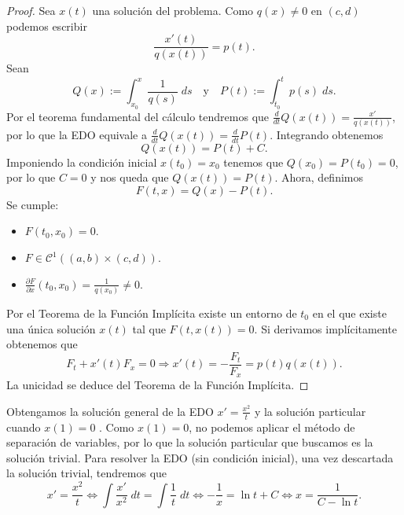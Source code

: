 \begin{proof}
	 Sea $\displaystyle x\left(t\right) $ una solución del problema. Como $\displaystyle q\left(x\right) \neq 0$ en $\displaystyle \left(c,d\right) $ podemos escribir
	\[\frac{x'\left(t\right)}{q\left(x\left(t\right)\right)} = p\left(t\right) .\]
Sean 
\[Q\left(x\right) := \int ^{x}_{x_{0}}\frac{1}{q\left(s\right)} \; d s \quad \text{y} \quad P\left(t\right):= \int ^{t}_{t_{0}}p\left(s\right) \; d s .\]
Por el teorema fundamental del cálculo tendremos que $\displaystyle \frac{d}{dt}Q\left(x\left(t\right)\right) = \frac{x'}{q\left(x\left(t\right)\right)} $, por lo que la EDO equivale a $\displaystyle \frac{d}{dt}Q\left(x\left(t\right)\right) = \frac{d}{dt}P\left(t\right) $. Integrando obtenemos 
\[Q\left(x\left(t\right)\right)= P\left(t\right) + C .\]
Imponiendo la condición inicial $\displaystyle x\left(t_{0}\right)=x_{0} $ tenemos que $\displaystyle Q\left(x_{0}\right) = P\left(t_{0}\right) = 0 $, por lo que $\displaystyle C = 0 $ y nos queda que $\displaystyle Q\left(x\left(t\right)\right)=P\left(t\right) $. Ahora, definimos
\[F\left(t,x\right)= Q\left(x\right)-P\left(t\right) .\]
Se cumple:
\begin{itemize}
\item $\displaystyle F\left(t_{0}, x_{0}\right)=0 $.
\item $\displaystyle F \in \mathcal{C}^{1}\left(\left(a, b\right)\times \left(c,d\right)\right) $.
\item $\displaystyle \frac{\partial F}{\partial x}\left(t_{0}, x_{0}\right)= \frac{1}{q\left(x_{0}\right)} \neq 0 $.
\end{itemize}
Por el Teorema de la Función Implícita existe un entorno de $\displaystyle t_{0} $ en el que existe una única solución $\displaystyle x\left(t\right) $ tal que $\displaystyle F\left(t,x\left(t\right)\right)=0 $. Si derivamos implícitamente obtenemos que 
\[F_{t} + x'\left(t\right)F_{x}= 0 \Rightarrow x'\left(t\right)= - \frac{F_{t}}{F_{x}} = p\left(t\right)q\left(x\left(t\right)\right) .\]
La unicidad se deduce del Teorema de la Función Implícita. 
\end{proof}
\begin{eg}
Obtengamos la solución general de la EDO $\displaystyle x' = \frac{x^{2}}{t} $ y la solución particular cuando $\displaystyle x\left(1\right) = 0 $ . Como $\displaystyle x\left(1\right)=0 $, no podemos aplicar el método de separación de variables, por lo que la solución particular que buscamos es la solución trivial. Para resolver la EDO (sin condición inicial), una vez descartada la solución trivial, tendremos que
\[ x' = \frac{x^{2}}{t} \iff \int \frac{x'}{x^{2}} \; dt = \int \frac{1}{t} \; dt \iff -\frac{1}{x} = \ln t + C \iff x = \frac{1}{C - \ln t}.\]
\end{eg}
